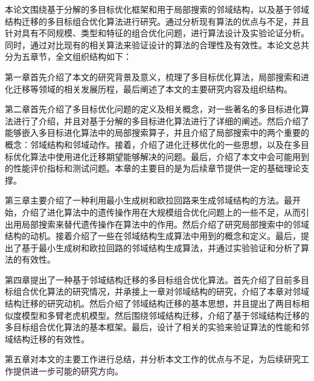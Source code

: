 本论文围绕基于分解的多目标优化框架和用于局部搜索的邻域结构，以及基于邻域结构迁移的多目标组合优化算法进行研究。通过分析现有算法的优点与不足，并且针对具有不同规模、类型和特征的组合优化问题，进行算法设计及实验论证分析。同时，通过对比现有的相关算法来验证设计的算法的合理性及有效性。本论文总共分为五章节，全文组织结构如下：
\par
第一章首先介绍了本文的研究背景及意义，梳理了多目标优化算法，局部搜索和进化迁移等领域的相关发展历程，最后阐述了本文的主要研究内容及组织结构。
\par
第二章首先介绍了多目标优化问题的定义及相关概念，对一些著名的多目标进化算法进行了介绍，并且对基于分解的多目标进化算法进行了详细的阐述。然后介绍了能够嵌入多目标进化算法中的局部搜索算子，并且介绍了局部搜索中的两个重要的概念：邻域结构和邻域动作。接着，介绍了进化迁移优化的一些思想，以及在多目标优化算法中使用进化迁移期望能够解决的问题。最后，介绍了本文中会可能用到的性能评价指标和测试问题。本章的主要目的是为后续章节提供一定的基础理论支撑。
\par
第三章主要介绍了一种利用最小生成树和欧拉回路来生成邻域结构的方法。最开始，介绍了进化算法中的遗传操作用在大规模组合优化问题上的一些不足，从而引出用局部搜索来替代遗传操作在算法中的作用。然后介绍了研究局部搜索中的邻域结构的动机。接着介绍了一些在邻域结构生成算法中用到的概念和定义。最后，提出了基于最小生成树和欧拉回路的邻域结构生成算法，并通过实验验证和分析了算法的有效性。
\par
第四章提出了一种基于邻域结构迁移的多目标组合优化算法。首先介绍了目前多目标组合优化算法的研究情况，并承接上一章对邻域结构的研究，介绍了本章对邻域结构迁移的研究动机。然后介绍了邻域结构迁移的基本思想，并且提出了两目标相似度模型和多臂老虎机模型。然后围绕邻域结构迁移，介绍了基于邻域结构迁移的多目标组合优化算法的基本框架。最后，设计了相关的实验来验证算法的性能和邻域结构迁移的有效性。
\par
第五章对本文的主要工作进行总结，并分析本文工作的优点与不足，为后续研究工作提供进一步可能的研究方向。